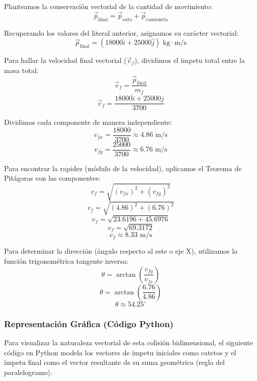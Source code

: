 \documentclass{article}
\begin{document}
Planteamos la conservación vectorial de la cantidad de movimiento:
$$\vec{p}_{\text{final}} = \vec{p}_{\text{auto}} + \vec{p}_{\text{camioneta}}$$

Recuperando los valores del literal anterior, asignamos su carácter vectorial:
$$\vec{p}_{\text{final}} = (18000\hat{i} + 25000\hat{j}) \text{ kg}\cdot\text{m/s}$$

Para hallar la velocidad final vectorial ($\vec{v}_f$), dividimos el ímpetu total entre la masa total:
$$\vec{v}_f = \frac{\vec{p}_{\text{final}}}{m_f}$$
$$\vec{v}_f = \frac{18000\hat{i} + 25000\hat{j}}{3700}$$

Dividimos cada componente de manera independiente:
$$v_{fx} = \frac{18000}{3700} \approx 4.86 \text{ m/s}$$
$$v_{fy} = \frac{25000}{3700} \approx 6.76 \text{ m/s}$$

Para encontrar la rapidez (módulo de la velocidad), aplicamos el Teorema de Pitágoras con las componentes:
$$v_f = \sqrt{(v_{fx})^2 + (v_{fy})^2}$$
$$v_f = \sqrt{(4.86)^2 + (6.76)^2}$$
$$v_f = \sqrt{23.6196 + 45.6976}$$
$$v_f = \sqrt{69.3172}$$
$$v_f \approx 8.33 \text{ m/s}$$

Para determinar la dirección (ángulo respecto al este o eje X), utilizamos la función trigonométrica tangente inversa:
$$\theta = \arctan\left(\frac{v_{fy}}{v_{fx}}\right)$$
$$\theta = \arctan\left(\frac{6.76}{4.86}\right)$$
$$\theta \approx 54.25^\circ$$

\subsubsection*{Representación Gráfica (Código Python)}
Para visualizar la naturaleza vectorial de esta colisión bidimensional, el siguiente código en Python modela los vectores de ímpetu iniciales como catetos y el ímpetu final como el vector resultante de su suma geométrica (regla del paralelogramo).
\end{document}

